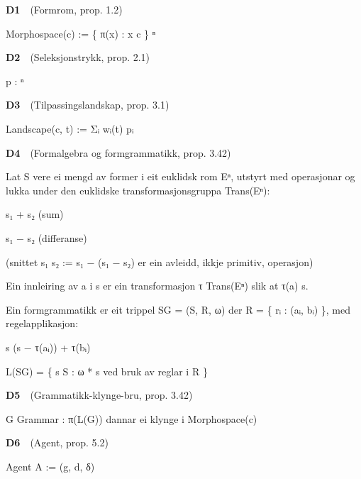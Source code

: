 \documentclass[10pt]{article}
\begin{document}
\noindent\textbf{D1}~~(Formrom, prop. 1.2)




Morphospace(c) := \{ π(x) : x  c \}  ⁿ




\noindent\textbf{D2}~~(Seleksjonstrykk, prop. 2.1)




p : ⁿ  




\noindent\textbf{D3}~~(Tilpassingslandskap, prop. 3.1)




Landscape(c, t) := Σᵢ wᵢ(t)  pᵢ




\noindent\textbf{D4}~~(Formalgebra og formgrammatikk, prop. 3.42)




Lat S vere ei mengd av former i eit euklidsk rom Eⁿ, utstyrt med operasjonar og lukka under den euklidske transformasjonsgruppa Trans(Eⁿ):




s₁ + s₂ (sum)




s₁ − s₂ (differanse)




(snittet s₁  s₂ := s₁ − (s₁ − s₂) er ein avleidd, ikkje primitiv, operasjon)




Ein innleiring av a i s er ein transformasjon τ  Trans(Eⁿ) slik at τ(a)  s.




Ein formgrammatikk er eit trippel SG = (S, R, ω) der R = \{ rᵢ : (aᵢ, bᵢ) \}, med regelapplikasjon:




s  (s − τ(aᵢ)) + τ(bᵢ)




L(SG) = \{ s  S : ω * s ved bruk av reglar i R \}




\noindent\textbf{D5}~~(Grammatikk-klynge-bru, prop. 3.42)




G  Grammar : π(L(G)) dannar ei klynge i Morphospace(c)




\noindent\textbf{D6}~~(Agent, prop. 5.2)




Agent A := (g, d, δ)
\end{document}
